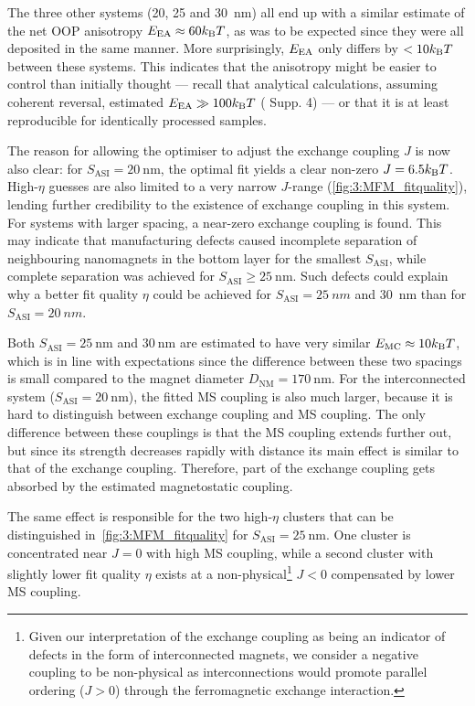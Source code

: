 The three other systems (20, 25 and \SI{30}{\nano\metre}) all end up with a similar estimate of the net OOP anisotropy $\EEA \approx 60 \kBT$, as was to be expected since they were all deposited in the same manner.
More surprisingly, $E_\mathrm{EA}$ only differs by $< 10 \kBT$ between these systems.
This indicates that the anisotropy might be easier to control than initially thought --- recall that analytical calculations, assuming coherent reversal, estimated $\EEA \gg 100 \kBT$ ( Supp. 4) --- or that it is at least reproducible for identically processed samples. \par
The reason for allowing the optimiser to adjust the exchange coupling $J$ is now also clear: for $S_\mathrm{ASI} = \SI{20}{\nano\metre}$, the optimal fit yields a clear non-zero $J = 6.5 \kBT$.
High-$\eta$ guesses are also limited to a very narrow $J$-range (\cref{fig:3:MFM_fitquality}), lending further credibility to the existence of exchange coupling in this system.
For systems with larger spacing, a near-zero exchange coupling is found.
This may indicate that manufacturing defects caused incomplete separation of neighbouring nanomagnets in the bottom  layer for the smallest $S_\mathrm{ASI}$, while complete separation was achieved for $S_\mathrm{ASI} \geq \SI{25}{\nano\metre}$.
Such defects could explain why a better fit quality $\eta$ could be achieved for $S_\mathrm{ASI} = \SI{25}{nm}$ and \SI{30}{\nano\metre} than for $S_\mathrm{ASI} = \SI{20}{nm}$. \par
Both $S_\mathrm{ASI} = \SI{25}{\nano\metre}$ and $\SI{30}{\nano\metre}$ are estimated to have very similar $\EMC \approx 10 \kBT$, which is in line with expectations since the difference between these two spacings is small compared to the magnet diameter $D_\mathrm{NM} = \SI{170}{\nano\metre}$.
For the interconnected system ($S_\mathrm{ASI} = \SI{20}{\nano\metre}$), the fitted MS coupling is also much larger, because it is hard to distinguish between exchange coupling and MS coupling.
The only difference between these couplings is that the MS coupling extends further out, but since its strength decreases rapidly with distance its main effect is similar to that of the exchange coupling.
Therefore, part of the exchange coupling gets absorbed by the estimated magnetostatic coupling. \par
The same effect is responsible for the two high-$\eta$ clusters that can be distinguished in~\cref{fig:3:MFM_fitquality} for $S_\mathrm{ASI} = \SI{25}{\nano\metre}$.
One cluster is concentrated near $J=0$ with high MS coupling, while a second cluster with slightly lower fit quality $\eta$ exists at a non-physical\footnote{
	Given our interpretation of the exchange coupling as being an indicator of defects in the form of interconnected magnets, we consider a negative coupling to be non-physical as interconnections would promote parallel ordering ($J > 0$) through the ferromagnetic exchange interaction.
} $J < 0$ compensated by lower MS coupling.
